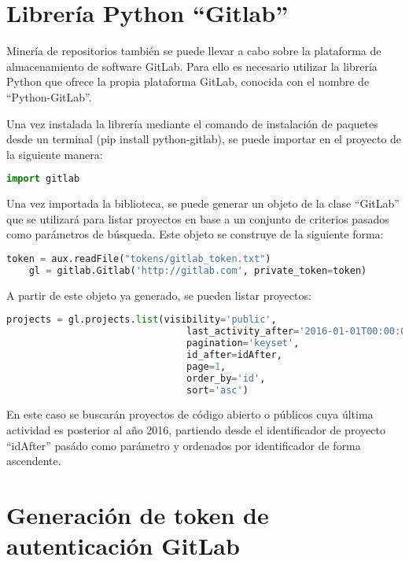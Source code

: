 \section{Librería Python ``Gitlab''}

Minería de repositorios también se puede llevar a cabo sobre la plataforma de almacenamiento de software GitLab. Para ello es necesario utilizar la librería Python que ofrece la propia plataforma GitLab, conocida con el nombre de ``Python-GitLab''.

Una vez instalada la librería mediante el comando de instalación de paquetes desde un terminal (pip install python-gitlab), se puede importar en el proyecto de la siguiente manera:

\begin{lstlisting}[language=Python]
    import gitlab
\end{lstlisting}

Una vez importada la biblioteca, se puede generar un objeto de la clase ``GitLab'' que se utilizará para listar proyectos en base a un conjunto de criterios pasados como parámetros de búsqueda. Este objeto se construye de la siguiente forma:

\begin{lstlisting}[language=Python]
    token = aux.readFile("tokens/gitlab_token.txt")
    gl = gitlab.Gitlab('http://gitlab.com', private_token=token)
\end{lstlisting}

A partir de este objeto ya generado, se pueden listar proyectos:

\begin{lstlisting}[language=Python]
    projects = gl.projects.list(visibility='public', 
                                last_activity_after='2016-01-01T00:00:00Z', 
                                pagination='keyset', 
                                id_after=idAfter, 
                                page=1, 
                                order_by='id', 
                                sort='asc')
\end{lstlisting}

En este caso se buscarán proyectos de código abierto o públicos cuya última actividad es posterior al año 2016, partiendo desde el identificador de proyecto ``idAfter'' pasádo como parámetro y ordenados por identificador de forma ascendente.

\section{Generación de token de autenticación GitLab}

